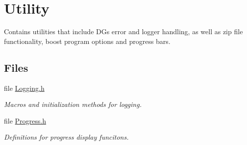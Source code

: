 \hypertarget{group___utility_module}{}\section{Utility}
\label{group___utility_module}


Contains utilities that include DG\textquotesingle{}s error and logger handling, as well as zip file functionality, boost program options and progress bars.  


\subsection*{Files}
\begin{DoxyCompactItemize}
\item 
file \hyperlink{_logging_8h}{Logging.\+h}
\begin{DoxyCompactList}\small\item\em Macros and initialization methods for logging. \end{DoxyCompactList}\item 
file \hyperlink{_progress_8h}{Progress.\+h}
\begin{DoxyCompactList}\small\item\em Definitions for progress display funcitons. \end{DoxyCompactList}\end{DoxyCompactItemize}
